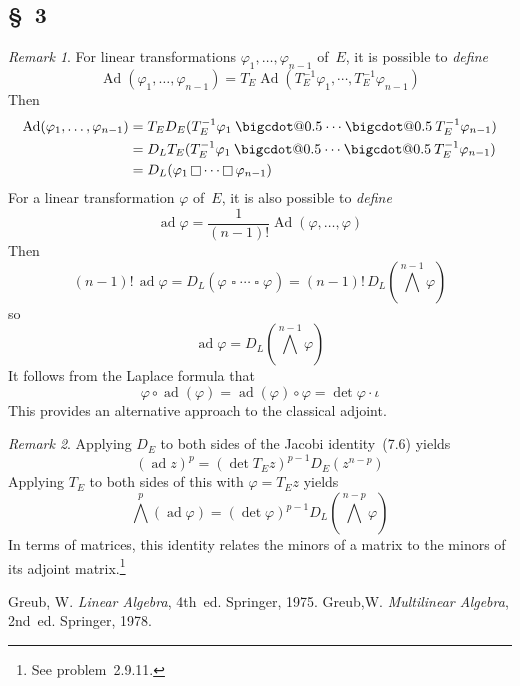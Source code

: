 \documentclass[letterpaper,12pt]{article}
\makeatletter
\DeclareMathOperator{\ad}{ad}
\DeclareMathOperator{\Ad}{Ad}
\newcommand{\bigcdot}[1]{\mathbin{\mathpalette\bigcdot@{#1}}}
\newcommand{\bigcdot@}[2]{%
  \sbox0{$#1\vcenter{}$}%
  \sbox2{$#1\cdot\m@th$}%
  \hbox{%
    \hfil
    \raise\ht0\hbox{%
      \scalebox{#2}{%
        \lower\ht0\hbox{$#1\bullet\m@th$}%
      }%
    }%
    \hfil
  }%
}
\newcommand{\after}{\circ}
\newcommand{\mult}{\cdot}
\newcommand{\bigeprod}{\bigwedge}
\newcommand{\medeprod}{{\textstyle\bigeprod}}
\newcommand{\mprod}{\bigcdot{0.5}}
\newcommand{\bprod}{\mathop{\square}}
\newcommand{\multi}[4]{#2_{#3}#1\cdots#1#2_{#4}}
\newcommand{\mprods}[3]{\multi{\mprod}{#1}{#2}{#3}}
\newcommand{\bprods}[3]{\multi{\bprod}{#1}{#2}{#3}}
\theoremstyle{definition}
\theoremstyle{remark}
\newtheorem*{rmk}{Remark}
\makeatother
\begin{document}
\subsection*{\S~3}
\begin{rmk}
For linear transformations \(\varphi_1,\ldots,\varphi_{n-1}\) of~\(E\), it is possible to \emph{define}
\[\Ad(\varphi_1,\ldots,\varphi_{n-1})=T_E\Ad(T_E^{-1}\varphi_1,\cdots,T_E^{-1}\varphi_{n-1})\]
Then
\begin{align*}
\Ad(\varphi_1,\ldots,\varphi_{n-1})&=T_ED_E(\mprods{T_E^{-1}\varphi}{1}{n-1})\\
	&=D_LT_E(\mprods{T_E^{-1}\varphi}{1}{n-1})\\
	&=D_L(\bprods{\varphi}{1}{n-1})
\end{align*}
For a linear transformation \(\varphi\) of~\(E\), it is also possible to \emph{define}
\[\ad\varphi=\frac{1}{(n-1)!}\Ad(\varphi,\ldots,\varphi)\]
Then
\[(n-1)!\,\ad\varphi=D_L(\bprods{\varphi}{}{})=(n-1)!\,D_L(\medeprod^{n-1}\varphi)\]
so
\[\ad\varphi=D_L(\medeprod^{n-1}\varphi)\]
It follows from the Laplace formula that
\[\varphi\after\ad(\varphi)=\ad(\varphi)\after\varphi=\det\varphi\mult\iota\]
This provides an alternative approach to the classical adjoint.
\end{rmk}

\begin{rmk}
Applying \(D_E\) to both sides of the Jacobi identity~(7.6) yields
\[(\ad z)^p=(\det T_Ez)^{p-1}D_E(z^{n-p})\]
Applying \(T_E\) to both sides of this with \(\varphi=T_Ez\) yields
\[\medeprod^p(\ad\varphi)=(\det\varphi)^{p-1}D_L(\medeprod^{n-p}\varphi)\]
In terms of matrices, this identity relates the minors of a matrix to the minors of its adjoint matrix.\footnote{See problem~2.9.11.}
\end{rmk}

\newpage
\begin{thebibliography}{0}
 Greub, W. \textit{Linear Algebra}, 4th~ed. Springer, 1975.
 Greub,W. \textit{Multilinear Algebra}, 2nd~ed. Springer, 1978.
\end{thebibliography}
\end{document}
